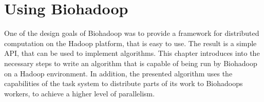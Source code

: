 \chapter{Using Biohadoop}
\label{chap:usage}
One of the design goals of Biohadoop was to provide a framework for distributed computation on the Hadoop platform, that is easy to use. The result is a simple API, that can be used to implement algorithms. This chapter introduces into the necessary steps to write an algorithm that is capable of being run by Biohadoop on a Hadoop environment. In addition, the presented algorithm uses the capabilities of the task system to distribute parts of its work to Biohadoops workers, to achieve a higher level of parallelism.

% 
% 
